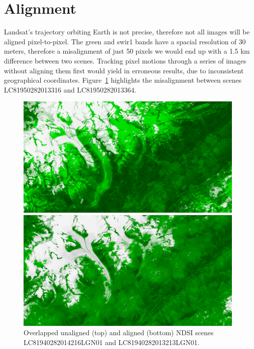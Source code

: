 \documentclass[12pt, a4paper]{report}
\begin{document}

	\section{Alignment}
	\label{seq:alignment_functional}
	
	\par Landsat’s trajectory orbiting Earth is not precise, therefore not all images will be
	aligned pixel-to-pixel. The green and swir1 bands have a spacial resolution of 30 meters, therefore a misalignment of just 50 pixels
	we would end up with a 1.5 km difference between two scenes. Tracking pixel motions through
	a series of images without aligning them first would yield in erroneous results, due to inconsistent geographical coordinates. Figure~\ref{fig:alignment_example} highlights the misalignment between
	scenes LC81950282013316 and LC81950282013364.
	
	\begin{figure}
		\centering
		\begin{minipage}[0.2]{\columnwidth}
			\centering
			\includegraphics[width=\columnwidth]{../images/LC81940282013213LGN01_LC81940282015219LGN01_unaligned.png}
		\end{minipage}
		\begin{minipage}[0.2]{\columnwidth}
			\centering
			\includegraphics[width=\columnwidth]{../images/LC81940282014216LGN01_LC81940282015219LGN01_aligned.png}
		\end{minipage}
		\caption{Overlapped unaligned (top) and aligned (bottom) NDSI scenes LC81940282014216LGN01 and LC81940282013213LGN01.}
		\label{fig:alignment_example}
	\end{figure}
\end{document}
